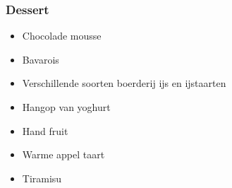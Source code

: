 \subsubsection*{Dessert}
\begin{itemize}
	\item	Chocolade mousse
	\item	Bavarois
	\item	Verschillende soorten boerderij ijs en ijstaarten
	\item	Hangop van yoghurt
	\item	Hand fruit
	\item	Warme appel taart
	\item	Tiramisu
\end{itemize}

